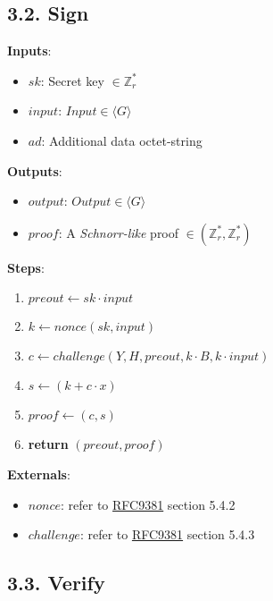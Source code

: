 \documentclass[
]{article}
\providecommand{\tightlist}{%
  \setlength{\itemsep}{0pt}\setlength{\parskip}{0pt}}
\begin{document}
\hypertarget{sign}{%
\subsection{3.2. Sign}\label{sign}}

\textbf{Inputs}:

\begin{itemize}
\tightlist
\item
  \(sk\): Secret key \(\in \mathbb{Z}^*_r\)
\item
  \(input\): \(Input \in \langle G \rangle\)
\item
  \(ad\): Additional data octet-string
\end{itemize}

\textbf{Outputs}:

\begin{itemize}
\tightlist
\item
  \(output\): \(Output \in \langle G \rangle\)
\item
  \(proof\): A \emph{Schnorr-like} proof
  \(\in (\mathbb{Z}^*_r, \mathbb{Z}^*_r)\)
\end{itemize}

\textbf{Steps}:

\begin{enumerate}
\def\labelenumi{\arabic{enumi}.}
\tightlist
\item
  \(preout \leftarrow sk \cdot input\)
\item
  \(k \leftarrow nonce(sk, input)\)
\item
  \(c \leftarrow challenge(Y, H, preout, k \cdot B, k \cdot input)\)
\item
  \(s \leftarrow (k + c \cdot x)\)
\item
  \(proof \leftarrow (c, s)\)
\item
  \textbf{return} \((preout, proof)\)
\end{enumerate}

\textbf{Externals}:

\begin{itemize}
\tightlist
\item
  \(nonce\): refer to
  \href{https://datatracker.ietf.org/doc/rfc9381/}{RFC9381} section
  5.4.2
\item
  \(challenge\): refer to
  \href{https://datatracker.ietf.org/doc/rfc9381/}{RFC9381} section
  5.4.3
\end{itemize}

\hypertarget{verify}{%
\subsection{3.3. Verify}\label{verify}}
\end{document}
